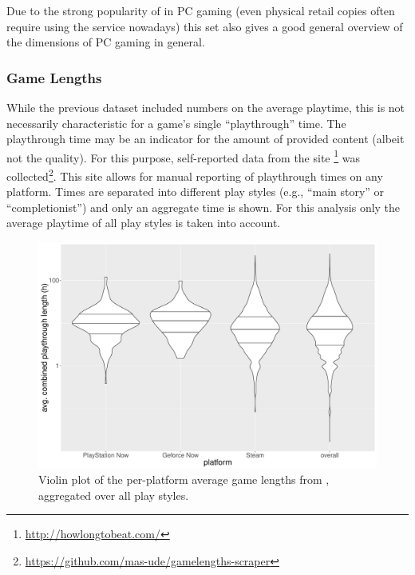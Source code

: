 Due to the strong popularity of \steam in PC gaming (even physical retail copies often require using the service nowadays) this set also gives a good general overview of the dimensions of PC gaming in general.


\subsubsection{Game Lengths}

While the previous dataset included numbers on the average playtime, this is not necessarily characteristic for a game's single ``playthrough'' time. The playthrough time may be an indicator for the amount of provided content (albeit not the quality). For this purpose, self-reported data from the site \hltb\footnote{\url{http://howlongtobeat.com/}} was collected\footnote{\url{https://github.com/mas-ude/gamelengths-scraper}}. This site allows for manual reporting of playthrough times on any platform. Times are separated into different play styles (e.g., ``main story'' or ``completionist'') and only an aggregate time is shown. For this analysis only the average playtime of all play styles is taken into account. %


\begin{figure}[!t]
	\centering
	\includegraphics[width=1.0\columnwidth]{images/gamelengths-by-platform-violin.pdf}
	\caption{Violin plot of the per-platform average game lengths from \hltb, aggregated over all play styles.}	
\label{fig:gamelengths-violin}
\end{figure}

